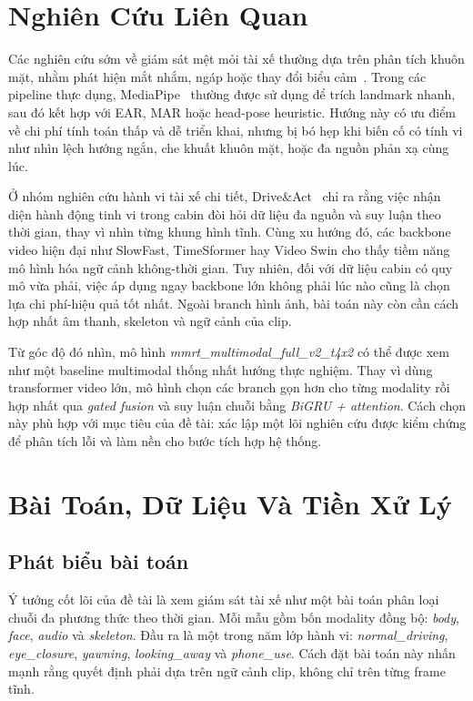 \documentclass[conference,a4paper]{IEEEtran}
\begin{document}
\section[Nghien Cuu Lien Quan]{Nghiên Cứu Liên Quan}
Các nghiên cứu sớm về giám sát mệt mỏi tài xế thường dựa trên phân tích khuôn mặt, nhằm phát hiện mắt nhắm, ngáp hoặc thay đổi biểu cảm~\cite{dms}. Trong các pipeline thực dụng, MediaPipe~\cite{mediapipe} thường được sử dụng để trích landmark nhanh, sau đó kết hợp với EAR, MAR hoặc head-pose heuristic. Hướng này có ưu điểm về chi phí tính toán thấp và dễ triển khai, nhưng bị bó hẹp khi biến cố có tính vi như nhìn lệch hướng ngắn, che khuất khuôn mặt, hoặc đa nguồn phản xạ cùng lúc.

Ở nhóm nghiên cứu hành vi tài xế chi tiết, Drive\&Act~\cite{driveact} chỉ ra rằng việc nhận diện hành động tinh vi trong cabin đòi hỏi dữ liệu đa nguồn và suy luận theo thời gian, thay vì nhìn từng khung hình tĩnh. Cùng xu hướng đó, các backbone video hiện đại như SlowFast, TimeSformer hay Video Swin cho thấy tiềm năng mô hình hóa ngữ cảnh không-thời gian. Tuy nhiên, đối với dữ liệu cabin có quy mô vừa phải, việc áp dụng ngay backbone lớn không phải lúc nào cũng là chọn lựa chi phí-hiệu quả tốt nhất. Ngoài branch hình ảnh, bài toán này còn cần cách hợp nhất âm thanh, skeleton và ngữ cảnh của clip.

Từ góc độ đó nhìn, mô hình \textit{mmrt\_multimodal\_full\_v2\_t4x2} có thể được xem như một baseline multimodal thống nhất hướng thực nghiệm. Thay vì dùng transformer video lớn, mô hình chọn các branch gọn hơn cho từng modality rồi hợp nhất qua \textit{gated fusion} và suy luận chuỗi bằng \textit{BiGRU + attention}. Cách chọn này phù hợp với mục tiêu của đề tài: xác lập một lõi nghiên cứu được kiểm chứng để phân tích lỗi và làm nền cho bước tích hợp hệ thống.

\section[Bai Toan Du Lieu Va Tien Xu Ly]{Bài Toán, Dữ Liệu Và Tiền Xử Lý}
\subsection{Phát biểu bài toán}
Ý tưởng cốt lõi của đề tài là xem giám sát tài xế như một bài toán phân loại chuỗi đa phương thức theo thời gian. Mỗi mẫu gồm bốn modality đồng bộ: \textit{body}, \textit{face}, \textit{audio} và \textit{skeleton}. Đầu ra là một trong năm lớp hành vi: \textit{normal\_driving}, \textit{eye\_closure}, \textit{yawning}, \textit{looking\_away} và \textit{phone\_use}. Cách đặt bài toán này nhấn mạnh rằng quyết định phải dựa trên ngữ cảnh clip, không chỉ trên từng frame tĩnh.
\end{document}

